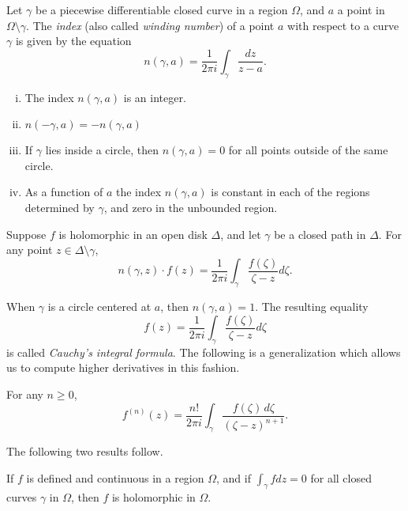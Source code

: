 \begin{definition}
  Let $\gamma$ be a piecewise differentiable closed curve in a region $\Omega$, and $a$ a point in $\Omega \setminus \gamma$. The \emph{index} (also called \emph{winding number}) of a point $a$ with respect to a curve $\gamma$ is given by the equation
  \[
  n(\gamma,a) = \frac{1}{2 \pi i} \int_\gamma \frac{d z}{z-a}.
  \]
\end{definition}

\begin{proposition}
  \mbox{}
  \begin{enumerate}[(i)]
  \item The index $n(\gamma,a)$ is an integer.
  \item $n(-\gamma,a) = -n(\gamma,a)$
  \item If $\gamma$ lies inside a circle, then $n(\gamma,a) = 0$ for all points outside of the same circle.
  \item As a function of $a$ the index $n(\gamma,a)$ is constant in each of the regions determined by $\gamma$, and zero in the unbounded region.
  \end{enumerate}
\end{proposition}

\begin{theorem}
  Suppose $f$ is holomorphic in an open disk $\Delta$, and let $\gamma$ be a closed path in $\Delta$. For any point $z \in \Delta \setminus \gamma$,
  \[
  n(\gamma,z) \cdot f(z) = \frac{1}{2 \pi i} \int_\gamma \frac{f(\zeta)}{\zeta-z} d \zeta.
  \]
\end{theorem}

When $\gamma$ is a circle centered at $a$, then $n(\gamma,a) = 1$. The resulting equality
\[
f(z) = \frac{1}{2 \pi i} \int_\gamma \frac{f(\zeta)}{\zeta-z} d \zeta
\]
is called \emph{Cauchy's integral formula}. The following is a generalization which allows us to compute higher derivatives in this fashion.

\begin{proposition}
  For any $n \geq 0$,
  \[
  f^{(n)}(z) = \frac{n!}{2 \pi i} \int_\gamma \frac{f(\zeta) \, d \zeta}{(\zeta - z)^{n+1}}.
  \]
\end{proposition}

The following two results follow.

\begin{theorem}
  If $f$ is defined and continuous in a region $\Omega$, and if $\int_\gamma f d z = 0$ for all closed curves $\gamma$ in $\Omega$, then $f$ is holomorphic in $\Omega$.
\end{theorem}


